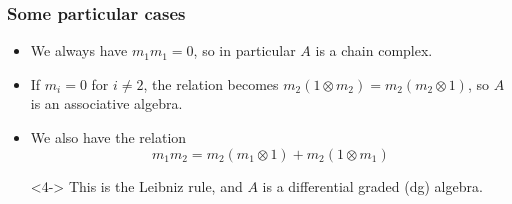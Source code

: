 \documentclass{beamer}
\theoremstyle{definition}
\begin{document}
\begin{frame}
\frametitle{Some particular cases}
\begin{itemize}
\item<1-> We always have $m_1m_1=0$, so in particular $A$ is a chain complex.%
\item<2-> If $m_i=0$ for $i\neq 2$, the relation becomes $m_2(1\otimes m_2)=m_2(m_2\otimes 1)$, so $A$ is an associative algebra.
\item<3->  We also have the relation \[m_1m_2=m_2(m_1\otimes 1)+m_2(1\otimes m_1)\]%
\item[]<4-> This is the Leibniz rule, and $A$ is a differential graded (dg) algebra.
\end{itemize}
\end{frame}
\end{document}

